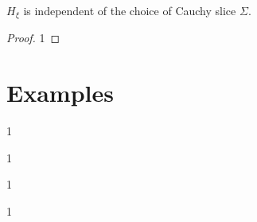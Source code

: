\documentclass[10pt]{article}
\begin{document}
\begin{claim}
    $H_\xi$ is independent of the choice of Cauchy slice $\Sigma$.
\end{claim}
\begin{proof}
    1
\end{proof}

\section{Examples}
\begin{example}
    1
\end{example}

\begin{example}
    1
\end{example}

\begin{example}
    1
\end{example}

\begin{example}
    1
\end{example}

\clearpage


\end{document}
